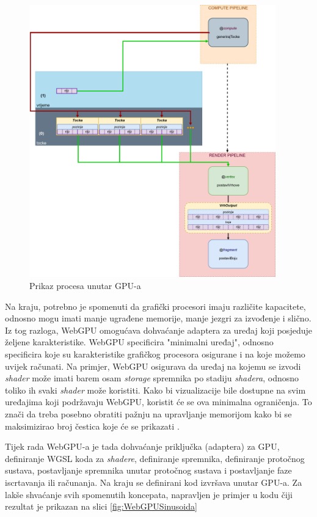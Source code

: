 \documentclass{foi}
\begin{document}
\begin{figure}[H]
	\centering
	\includegraphics[width=0.95\textwidth]{slike/39_Buffers.png}
	\captionsetup{justification=centering}
	\caption{Prikaz procesa unutar GPU-a}
	\label{fig:Buffers}
\end{figure}


Na kraju, potrebno je spomenuti da grafički procesori imaju različite kapacitete, odnosno mogu imati manje ugrađene memorije, manje jezgri za izvođenje i slično. Iz tog razloga, WebGPU omogućava dohvaćanje adaptera za uređaj koji posjeduje željene karakteristike. WebGPU specificira "minimalni uređaj", odnosno specificira koje su karakteristike grafičkog procesora osigurane i na koje možemo uvijek računati. Na primjer, WebGPU osigurava da uređaj na kojemu se izvodi \textit{shader} može imati barem osam \textit{storage} spremnika po stadiju \textit{shadera}, odnosno toliko ih svaki \textit{shader} može koristiti. Kako bi vizualizacije bile dostupne na svim uređajima koji podržavaju WebGPU, koristit će se ova minimalna ograničenja. To znači da treba posebno obratiti pažnju na upravljanje memorijom kako bi se maksimizirao broj čestica koje će se prikazati \parencite{WebGPUFundamentalsOptionalLimits}.
 
Tijek rada WebGPU-a je tada dohvaćanje priključka (adaptera) za GPU, definiranje WGSL koda za \textit{shadere}, definiranje spremnika, definiranje protočnog sustava, postavljanje spremnika unutar protočnog sustava i postavljanje faze iscrtavanja ili računanja. Na kraju se definirani kod izvršava unutar GPU-a. Za lakše shvaćanje svih spomenutih koncepata, napravljen je primjer u kodu čiji rezultat je prikazan na slici \ref{fig:WebGPUSinusoida}
\end{document}
